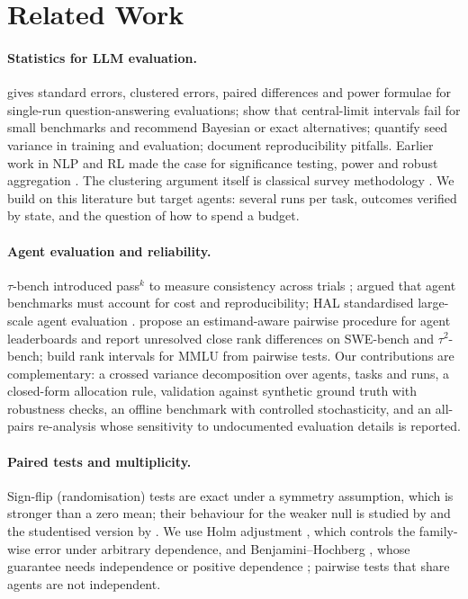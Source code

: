 \section{Related Work}
\paragraph{Statistics for LLM evaluation.} \citet{miller2024error} gives standard errors, clustered errors, paired differences and power formulae for single-run question-answering evaluations; \citet{bowyer2025clt} show that central-limit intervals fail for small benchmarks and recommend Bayesian or exact alternatives; \citet{madaan2024variance} quantify seed variance in training and evaluation; \citet{biderman2024lessons} document reproducibility pitfalls. Earlier work in NLP and RL made the case for significance testing, power and robust aggregation \citep{dietterich1998tests,dror2018hitchhiker,card2020power,agarwal2021precipice,bouthillier2021variance}. The clustering argument itself is classical survey methodology \citep{kish1965survey}. We build on this literature but target agents: several runs per task, outcomes verified by state, and the question of how to spend a budget.

\paragraph{Agent evaluation and reliability.} $\tau$-bench introduced pass$^k$ to measure consistency across trials \citep{yao2024taubench}; \citet{kapoor2024matter} argued that agent benchmarks must account for cost and reproducibility; HAL standardised large-scale agent evaluation \citep{kapoor2026hal}. \citet{huang2026leaderboard} propose an estimand-aware pairwise procedure for agent leaderboards and report unresolved close rank differences on SWE-bench and $\tau^2$-bench; \citet{neuhof2026ranking} build rank intervals for MMLU from pairwise tests. Our contributions are complementary: a crossed variance decomposition over agents, tasks and runs, a closed-form allocation rule, validation against synthetic ground truth with robustness checks, an offline benchmark with controlled stochasticity, and an all-pairs re-analysis whose sensitivity to undocumented evaluation details is reported.

\paragraph{Paired tests and multiplicity.} Sign-flip (randomisation) tests are exact under a symmetry assumption, which is stronger than a zero mean; their behaviour for the weaker null is studied by \citet{romano1990randomization} and the studentised version by \citet{janssen1997studentized}. We use Holm adjustment \citep{holm1979}, which controls the family-wise error under arbitrary dependence, and Benjamini--Hochberg \citep{benjamini1995}, whose guarantee needs independence or positive dependence \citep{benjamini2001dependency}; pairwise tests that share agents are not independent.

